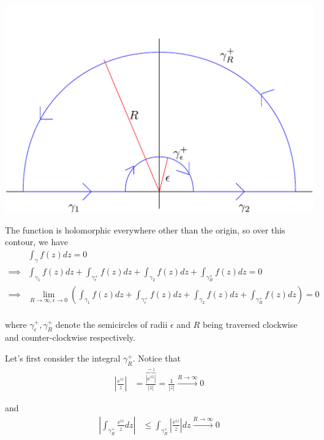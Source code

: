 \documentclass{article}
\begin{document}
\begin{center}
  \includegraphics*[scale=0.30]{Q5 HW 4.png}
\end{center}

The function is holomorphic everywhere other than the origin, so over this contour, we have 
\begin{align*}
  &\int_{\gamma} f(z) dz = 0 \\
  \implies & \int_{{\gamma}_1} f(z) dz + \int_{{\gamma}_{\epsilon}^{+}} f(z) dz + \int_{{\gamma}_2} f(z) dz + \int_{{\gamma}_{R}^{+}} f(z) dz = 0 \\
  \implies & \lim_{R \rightarrow \infty, \epsilon \rightarrow 0} \left(\int_{{\gamma}_1} f(z) dz + \int_{{\gamma}_{\epsilon}^{+}} f(z) dz + \int_{{\gamma}_2} f(z) dz + \int_{{\gamma}_{R}^{+}} f(z) dz\right) = 0 \\
\end{align*}

where ${\gamma}_{\epsilon}^{+}, {\gamma}_{R}^{+}$ denote the semicircles of radii $\epsilon$ and $R$ being traversed clockwise and counter-clockwise respectively.

\vskip 0.5cm
Let's first consider the integral ${\gamma}_{R}^{+}$. Notice that 
\begin{align*}
  \left| \frac{e^{iz}}{z} \right| &= \frac{ \overbrace{\left| e^{iz} \right|}^{=1} }{\left| z \right|} = \frac{1}{\left|z\right|} \xrightarrow{R \rightarrow \infty} 0
\end{align*}

and 
\begin{align*}
  \left|\int_{{\gamma}_{R}^{+}} \frac{e^{iz}}{z} dz\right| &\leq \int_{{\gamma}_{R}^{+}} \left| \frac{e^{iz}}{z} \right| dz \xrightarrow{R \rightarrow \infty} 0
\end{align*}
\end{document}

